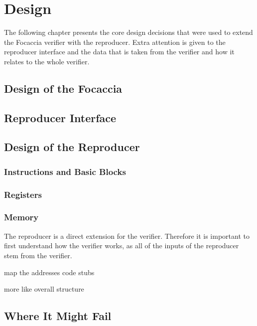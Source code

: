 
\chapter{Design}\label{chapter:design}



The following chapter presents the core design decisions that were used to extend the Focaccia verifier with the reproducer.
Extra attention is given to the reproducer interface and the data that is taken from the verifier and how it relates to the whole verifier.

\section{Design of the Focaccia}

\section{Reproducer Interface}

\section{Design of the Reproducer}

\subsection{Instructions and Basic Blocks}

\subsection{Registers}

\subsection{Memory}

The reproducer is a direct extension for the verifier.
Therefore it is important to first understand how the verifier works, as all of the inputs of the reproducer stem from the verifier.

map the addresses code stubs

more like overall structure

\section{Where It Might Fail}